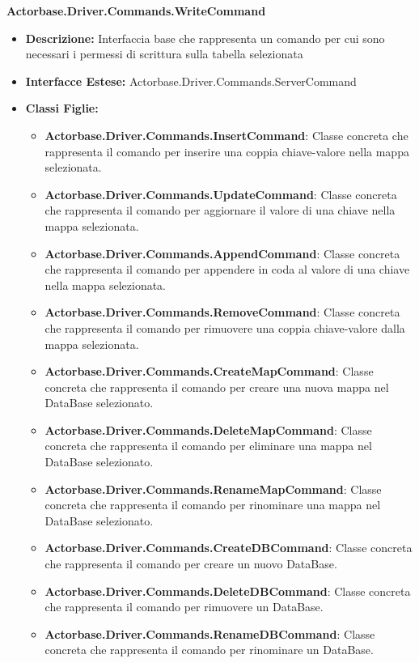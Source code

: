 \documentclass[a4paper]{article}
\begin{document}
		\textbf{Actorbase.Driver.Commands.WriteCommand}
		\begin{itemize}
				\item \textbf{Descrizione:} Interfaccia base che rappresenta un comando per cui sono necessari i permessi di scrittura sulla tabella selezionata
				\item \textbf{Interfacce Estese:} Actorbase.Driver.Commands.ServerCommand
				\item \textbf{Classi Figlie:}
					\begin{itemize}
						\item \textbf{Actorbase.Driver.Commands.InsertCommand}:
							Classe concreta che rappresenta il comando per inserire una coppia chiave-valore nella mappa selezionata.
						\item \textbf{Actorbase.Driver.Commands.UpdateCommand}:
							Classe concreta che rappresenta il comando per aggiornare il valore di una chiave nella mappa selezionata.
						\item \textbf{Actorbase.Driver.Commands.AppendCommand}:
							Classe concreta che rappresenta il comando per appendere in coda al valore di una chiave nella mappa selezionata.
						\item \textbf{Actorbase.Driver.Commands.RemoveCommand}:
							Classe concreta che rappresenta il comando per rimuovere una coppia chiave-valore dalla mappa selezionata.
						\item \textbf{Actorbase.Driver.Commands.CreateMapCommand}:
							Classe concreta che rappresenta il comando per creare una nuova mappa nel DataBase selezionato.
						\item \textbf{Actorbase.Driver.Commands.DeleteMapCommand}:
							Classe concreta che rappresenta il comando per eliminare una mappa nel DataBase selezionato.
						\item \textbf{Actorbase.Driver.Commands.RenameMapCommand}:
							Classe concreta che rappresenta il comando per rinominare una mappa nel DataBase selezionato.
						\item \textbf{Actorbase.Driver.Commands.CreateDBCommand}:
							Classe concreta che rappresenta il comando per creare un nuovo DataBase.
						\item \textbf{Actorbase.Driver.Commands.DeleteDBCommand}:
							Classe concreta che rappresenta il comando per rimuovere un DataBase.
						\item \textbf{Actorbase.Driver.Commands.RenameDBCommand}:
							Classe concreta che rappresenta il comando per rinominare un DataBase.
					\end{itemize}
			\end{itemize}
		
\end{document}
